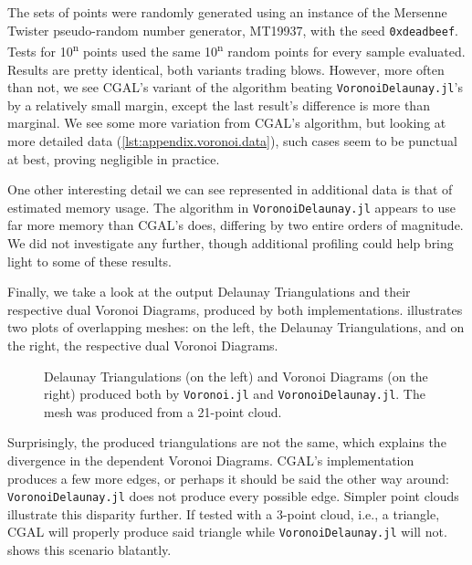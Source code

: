 The sets of points were randomly generated using an instance of the Mersenne
Twister pseudo-random number generator, MT19937, with the seed
\texttt{0xdeadbeef}.  Tests for 10\textsuperscript{n} points used the same
10\textsuperscript{n} random points for every sample evaluated.  Results are
pretty identical, both variants trading blows.  However, more often than not, we
see \ac{CGAL}'s variant of the algorithm beating \texttt{VoronoiDelaunay.jl}'s
by a relatively small margin, except the last result's difference is more than
marginal.  We see some more variation from \ac{CGAL}'s algorithm, but looking at
more detailed data (\cref{lst:appendix.voronoi.data}), such cases seem to be
punctual at best, proving negligible in practice.

One other interesting detail we can see represented in additional data is that
of estimated memory usage.  The algorithm in \texttt{VoronoiDelaunay.jl} appears
to use far more memory than \ac{CGAL}'s does, differing by two entire orders of
magnitude.  We did not investigate any further, though additional profiling
could help bring light to some of these results.

Finally, we take a look at the output Delaunay Triangulations and their
respective dual Voronoi Diagrams, produced by both implementations.
 illustrates two plots of overlapping meshes: on
the left, the Delaunay Triangulations, and on the right, the respective dual
Voronoi Diagrams.

\begin{figure}[!htb]
  \resizebox{\linewidth}{!}{}
  \caption[Voronoi Delaunay output comparison]{
    Delaunay Triangulations (on the left) and Voronoi Diagrams (on the right)
    produced both by \texttt{Voronoi.jl} and \texttt{VoronoiDelaunay.jl}.  The
    mesh was produced from a 21-point cloud.}%
  \label{fig:eval.voronoi.output}
\end{figure}

Surprisingly, the produced triangulations are not the same, which explains the
divergence in the dependent Voronoi Diagrams.  \Ac{CGAL}'s implementation
produces a few more edges, or perhaps it should be said the other way around:
\texttt{VoronoiDelaunay.jl} does not produce every possible edge.  Simpler point
clouds illustrate this disparity further.  If tested with a 3-point cloud, i.e.,
a triangle, \ac{CGAL} will properly produce said triangle while
\texttt{VoronoiDelaunay.jl} will not.   shows
this scenario blatantly.

